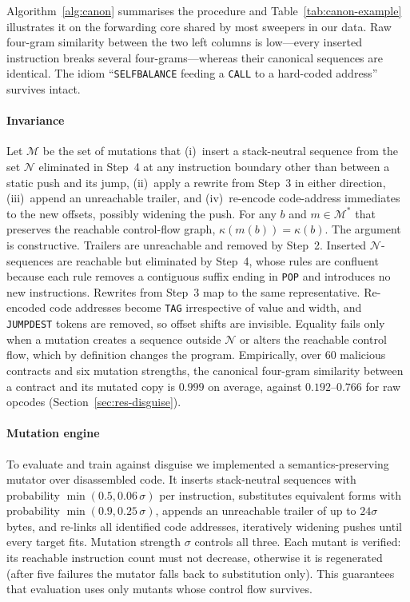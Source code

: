Algorithm~\ref{alg:canon} summarises the procedure and Table~\ref{tab:canon-example} illustrates it on the forwarding core shared by most sweepers in our data. Raw four-gram similarity between the two left columns is low---every inserted instruction breaks several four-grams---whereas their canonical sequences are identical. The idiom ``\texttt{SELFBALANCE} feeding a \texttt{CALL} to a hard-coded address'' survives intact.

\paragraph{Invariance} Let $\mathcal{M}$ be the set of mutations that (i)~insert a stack-neutral sequence from the set $\mathcal{N}$ eliminated in Step~4 at any instruction boundary other than between a static push and its jump, (ii)~apply a rewrite from Step~3 in either direction, (iii)~append an unreachable trailer, and (iv)~re-encode code-address immediates to the new offsets, possibly widening the push. For any $b$ and $m\in\mathcal{M}^{*}$ that preserves the reachable control-flow graph, $\kappa(m(b))=\kappa(b)$. The argument is constructive. Trailers are unreachable and removed by Step~2. Inserted $\mathcal{N}$-sequences are reachable but eliminated by Step~4, whose rules are confluent because each rule removes a contiguous suffix ending in \texttt{POP} and introduces no new instructions. Rewrites from Step~3 map to the same representative. Re-encoded code addresses become \texttt{TAG} irrespective of value and width, and \texttt{JUMPDEST} tokens are removed, so offset shifts are invisible. Equality fails only when a mutation creates a sequence outside $\mathcal{N}$ or alters the reachable control flow, which by definition changes the program. Empirically, over $60$ malicious contracts and six mutation strengths, the canonical four-gram similarity between a contract and its mutated copy is $0.999$ on average, against $0.192$--$0.766$ for raw opcodes (Section~\ref{sec:res-disguise}).

\paragraph{Mutation engine} To evaluate and train against disguise we implemented a semantics-preserving mutator over disassembled code. It inserts stack-neutral sequences with probability $\min(0.5,0.06\,\sigma)$ per instruction, substitutes equivalent forms with probability $\min(0.9,0.25\,\sigma)$, appends an unreachable trailer of up to $24\sigma$ bytes, and re-links all identified code addresses, iteratively widening pushes until every target fits. Mutation strength $\sigma$ controls all three. Each mutant is verified: its reachable instruction count must not decrease, otherwise it is regenerated (after five failures the mutator falls back to substitution only). This guarantees that evaluation uses only mutants whose control flow survives.

